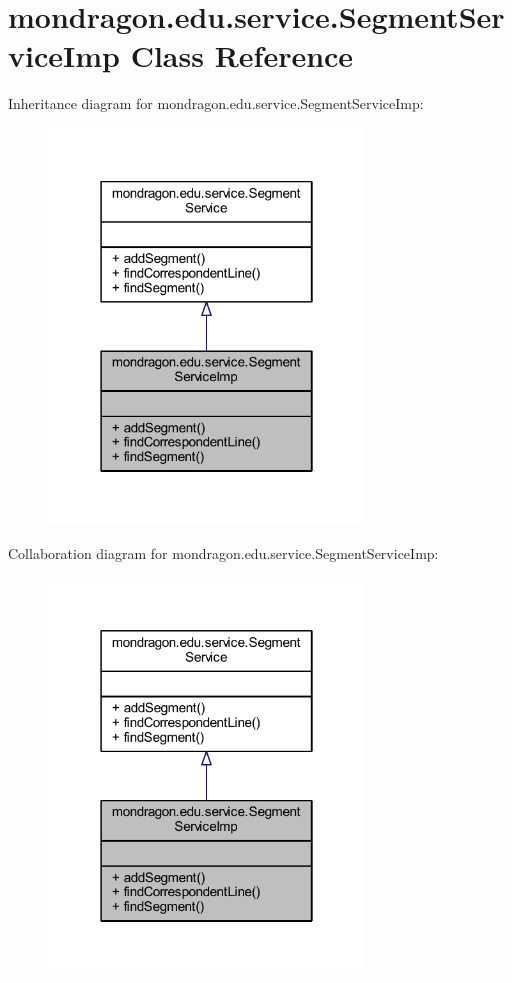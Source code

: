 \hypertarget{classmondragon_1_1edu_1_1service_1_1_segment_service_imp}{}\section{mondragon.\+edu.\+service.\+Segment\+Service\+Imp Class Reference}
\label{classmondragon_1_1edu_1_1service_1_1_segment_service_imp}


Inheritance diagram for mondragon.\+edu.\+service.\+Segment\+Service\+Imp\+:\nopagebreak
\begin{figure}[H]
\begin{center}
\leavevmode
\includegraphics[width=238pt]{classmondragon_1_1edu_1_1service_1_1_segment_service_imp__inherit__graph}
\end{center}
\end{figure}


Collaboration diagram for mondragon.\+edu.\+service.\+Segment\+Service\+Imp\+:\nopagebreak
\begin{figure}[H]
\begin{center}
\leavevmode
\includegraphics[width=238pt]{classmondragon_1_1edu_1_1service_1_1_segment_service_imp__coll__graph}
\end{center}
\end{figure}
